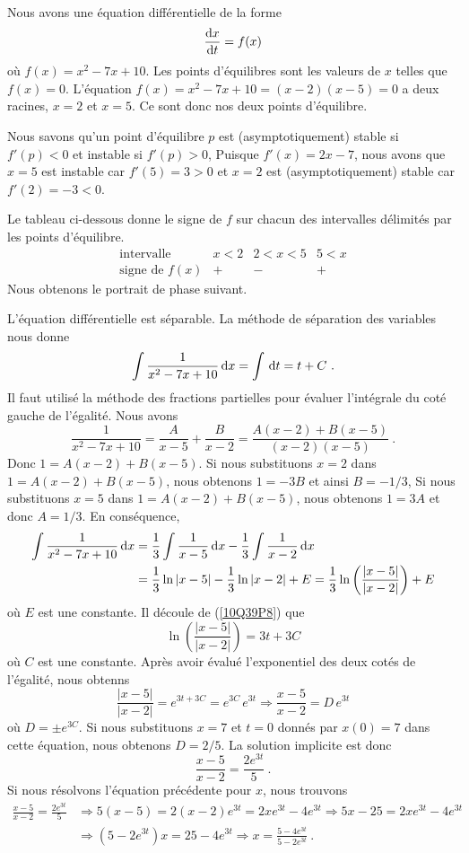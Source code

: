 {\\
 Nous avons une équation différentielle de la forme
\[
\frac{\mathrm{d}x}{\mathrm{d}t} = f(x)
\]
où $f(x) = x^2-7x+10$.  Les points d'équilibres sont les valeurs de
$x$ telles que $f(x)=0$.  L'équation $f(x)=x^2-7x+10=(x-2)(x-5)=0$ a deux
racines, $x=2$ et $x=5$.  Ce sont donc nos deux points d'équilibre.

Nous savons qu'un point d'équilibre $p$ est (asymptotiquement) stable si
$f'(p) < 0$ et instable si $f'(p) > 0$,  Puisque $f'(x) = 2x-7$, nous avons que
$x=5$ est instable car $f'(5) = 3>0$ et $x=2$ est (asymptotiquement)
stable car $f'(2) = -3 < 0$.

 Le tableau ci-dessous donne le signe de
$f$ sur chacun des intervalles délimités par les points d'équilibre.
\[
\begin{array}{c|c|c|c}
\text{intervalle} & x < 2 & 2 < x < 5 & 5 < x \\
\hline
\text{signe de }f(x) & + & - & +
\end{array}
\]
Nous obtenons le portrait de phase suivant.

 L'équation différentielle est séparable.  La méthode de
séparation des variables nous donne
\begin{equation}\label{10Q39P8}
\int \frac{1}{x^2-7x+10} \,\mathrm{d}x = \int \,\mathrm{d}t = t + C \ .
\end{equation}
Il faut utilisé la méthode des fractions partielles pour évaluer
l'intégrale du coté gauche de l'égalité.  Nous avons
\[
\frac{1}{x^2-7x+10} = \frac{A}{x-5} + \frac{B}{x-2} =
\frac{A(x-2)+B(x-5)}{(x-2)(x-5)} \ .
\]
Donc $1=A(x-2)+B(x-5)$.  Si nous substituons $x=2$ dans
$1=A(x-2)+B(x-5)$, nous obtenons $1= -3B$ et ainsi $B=-1/3$,  Si nous
substituons $x=5$ dans $1=A(x-2)+B(x-5)$, nous obtenons 
$1=3A$ et donc $A=1/3$.  En conséquence,
\begin{align*}
\int \frac{1}{x^2-7x+10} \,\mathrm{d}x &= \frac{1}{3} \int \frac{1}{x-5} \,\mathrm{d}x
- \frac{1}{3} \int \frac{1}{x-2} \,\mathrm{d}x \\
&= \frac{1}{3} \ln|x-5| - \frac{1}{3} \ln|x-2| + E
= \frac{1}{3} \ln \left(\frac{|x-5|}{|x-2|}\right) + E
\end{align*}
où $E$ est une constante.  Il découle de (\ref{10Q39P8}) que
\[
\ln \left(\frac{|x-5|}{|x-2|}\right) = 3t + 3C
\]
où $C$ est une constante.  Après avoir évalué  l'exponentiel des deux cotés de
l'égalité, nous obtenns
\[
\frac{|x-5|}{|x-2|} = e^{3t+3C}=e^{3C}\,e^{3t} 
\Rightarrow \frac{x-5}{x-2} = D \,e^{3t}
\]
où $D=\pm e^{3C}$.  Si nous substituons $x=7$ et $t=0$ donnés par $x(0)=7$
dans cette équation, nous obtenons $D = 2/5$.  La solution implicite est 
donc
\[
\frac{x-5}{x-2} = \frac{2 e^{3t}}{5} \ .
\]
Si nous résolvons l'équation précédente pour $x$, nous trouvons
\begin{align*}
\frac{x-5}{x-2} = \frac{2 e^{3t}}{5}
&\Rightarrow 5(x-5) = 2(x-2) e^{3t} = 2x e^{3t} - 4 e^{3t}
\Rightarrow 5x -25 = 2x e^{3t} - 4 e^{3t}\\
&\Rightarrow (5 - 2 e^{3t})x = 25 - 4 e^{3t}
\Rightarrow x = \frac{5- 4 e^{3t}}{5 - 2 e^{3t}} \ .
\end{align*}
}

